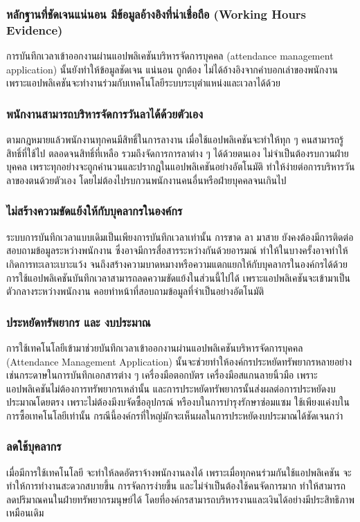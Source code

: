 \subsubsection{หลักฐานที่ชัดเจนแน่นอน มีข้อมูลอ้างอิงที่น่าเชื่อถือ (Working Hours Evidence)}
\quad การบันทึกเวลาเข้าออกงานผ่านแอปพลิเคชันบริหารจัดการบุคคล (attendance management application) 
นั้นยังทำให้ข้อมูลชัดเจน แน่นอน ถูกต้อง ไม่ได้อ้างอิงจากคำบอกเล่าของพนักงาน เพราะแอปพลิเคชันจะทำงานร่วมกับเทคโนโลยีระบบระบุตำแหน่งและเวลาได้ด้วย
\subsubsection{พนักงานสามารถบริหารจัดการวันลาได้ด้วยตัวเอง}
\quad ตามกฎหมายแล้วพนักงานทุกคนมีสิทธิ์ในการลางาน เมื่อใช้แอปพลิเคชันจะทำให้ทุก ๆ คนสามารถรู้สิทธิ์ที่ใช้ไป ตลอดจนสิทธิ์ที่เหลือ 
รวมถึงจัดการการลาต่าง ๆ ได้ด้วยตนเอง ไม่จำเป็นต้องรบกวนฝ่ายบุคคล เพราะทุกอย่างจะถูกคำนวนและปรากฎในแอปพลิเคชันอย่างอัตโนมัติ 
ทำให้ง่ายต่อการบริหารวันลาของตนด้วยตัวเอง โดยไม่ต้องไปรบกวนพนักงานคนอื่นหรือฝ่ายบุคคลจนเกินไป 
\subsubsection{ไม่สร้างความขัดแย้งให้กับบุคลากรในองค์กร}  
\quad ระบบการบันทึกเวลาแบบเดิมเป็นเพียงการบันทึกเวลาเท่านั้น การขาด ลา มาสาย ยังคงต้องมีการติดต่อสอบถามข้อมูลระหว่างพนักงาน 
ซึ่งอาจมีการสื่อสารระหว่างกันด้วยอารมณ์ ทำให้ในบางครั้งอาจทำให้เกิดการทะเลาะเบาะแว้ง จนถึงสร้างความบาดหมางหรือความแตกแยกให้กับบุคลากรในองค์กรได้ด้วย 
การใช้แอปพลิเคชันบันทึกเวลาสามารถลดความขัดแย้งในส่วนนี้ไปได้ เพราะแอปพลิเคชันจะเข้ามาเป็นตัวกลางระหว่างพนักงาน คอยทำหน้าที่สอบถามข้อมูลที่จำเป็นอย่างอัตโนมัติ
\subsubsection{ประหยัดทรัพยากร และ งบประมาณ}
\quad การใช้เทคโนโลยีเข้ามาช่วยบันทึกเวลาเข้าออกงานผ่านแอปพลิเคชันบริหารจัดการบุคคล (Attendance Management Application) 
นั้นจะช่วยทำให้องค์กรประหยัดทรัพยากรหลายอย่าง เช่นกระดาษในการบันทึกเอกสารต่าง ๆ เครื่องมือตอกบัตร เครื่องมือสแกนลายนิ้วมือ เพราะแอปพลิเคชันไม่ต้องการทรัพยากรเหล่านั้น 
และการประหยัดทรัพยากรนั้นส่งผลต่อการประหยัดงบประมาณโดยตรง เพราะไม่ต้องมีงบจัดซื้ออุปกรณ์ หรืองบในการบำรุงรักษาซ่อมแซม ใช้เพียงแค่งบในการซื้อเทคโนโลยีเท่านั้น 
กรณีนี้องค์กรที่ใหญ่มักจะเห็นผลในการประหยัดงบประมาณได้ชัดเจนกว่า 
\subsubsection{ลดใช้บุคลากร}  
\quad เมื่อมีการใช้เทคโนโลยี จะทำให้ลดอัตราจ้างพนักงานลงได้ เพราะเมื่อทุกคนร่วมกันใช้แอปพลิเคชัน 
จะทำให้การทำงานสะดวกสบายขึ้น การจัดการง่ายขึ้น และไม่จำเป็นต้องใช้คนจัดการมาก ทำให้สามารถลดปริมาณคนในฝ่ายทรัพยากรมนุษย์ได้ 
โดยที่องค์กรสามารถบริหารงานและเงินได้อย่างมีประสิทธิภาพเหมือนเดิม 

